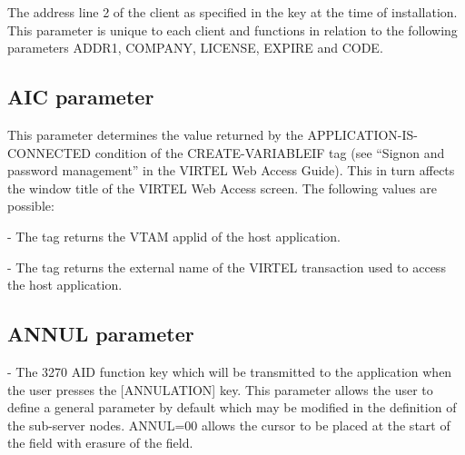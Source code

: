 \documentclass[letterpaper,10pt,english]{sphinxmanual}
\begin{document}
The address line 2 of the client as specified in the key at the time of installation. This parameter is unique to each client and functions in relation to the following parameters ADDR1, COMPANY, LICENSE, EXPIRE and CODE.

\ignorespaces 

\subsection{AIC parameter}
\label{\detokenize{Installation_Guide:aic-parameter}}\label{\detokenize{Installation_Guide:index-33}}
\begin{sphinxVerbatim}[commandchars=\\\{\}]
 
\end{sphinxVerbatim}

This parameter determines the value returned by the APPLICATION-IS-CONNECTED condition of the CREATE-VARIABLEIF tag (see “Signon and password management” in the VIRTEL Web Access Guide). This in turn affects the window title of the VIRTEL Web Access screen. The following values are possible:

 - The tag returns the VTAM applid of the host application.

 - The tag returns the external name of the VIRTEL transaction used to access the host application.

\ignorespaces 

\subsection{ANNUL parameter}
\label{\detokenize{Installation_Guide:annul-parameter}}\label{\detokenize{Installation_Guide:index-34}}
\begin{sphinxVerbatim}[commandchars=\\\{\}]
  
\end{sphinxVerbatim}

 - The 3270 AID function key which will be transmitted to the application when the user presses the {[}ANNULATION{]} key. This parameter allows the user to define a general parameter by default which may be modified in the definition of the sub-server nodes.
ANNUL=00 allows the cursor to be placed at the start of the field with erasure of the field.
\end{document}
